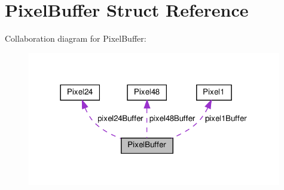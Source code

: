 \hypertarget{structPixelBuffer}{}\section{Pixel\+Buffer Struct Reference}
\label{structPixelBuffer}


Collaboration diagram for Pixel\+Buffer\+:
\nopagebreak
\begin{figure}[H]
\begin{center}
\leavevmode
\includegraphics[width=314pt]{structPixelBuffer__coll__graph}
\end{center}
\end{figure}
